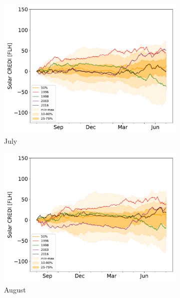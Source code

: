 \documentclass[12pt]{iopart}
\begin{document}
\begin{figure}[t]
\begin{subfigure}[t]{0.32\linewidth}
    \includegraphics[width=\linewidth]{Figures_SI/Fig_CUMSUM_YearStart_SPV_July}
    \caption{July }
\end{subfigure}
\begin{subfigure}[t]{0.32\linewidth}
    \includegraphics[width=\linewidth]{Figures_SI/Fig_CUMSUM_YearStart_SPV_August}
    \caption{August }
\end{subfigure}
\begin{subfigure}[t]{0.32\linewidth}

\end{subfigure}
\end{figure}
\end{document}
